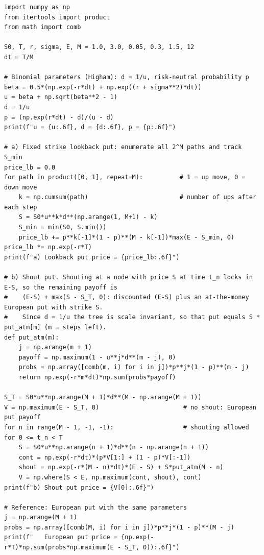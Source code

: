 \documentclass[11pt,a4paper]{article}
\begin{document}
\begin{lstlisting}[caption={Q5: binomial method for the lookback put and the shout put.}, label={lst:q5}]
import numpy as np
from itertools import product
from math import comb

S0, T, r, sigma, E, M = 1.0, 3.0, 0.05, 0.3, 1.5, 12
dt = T/M

# Binomial parameters (Higham): d = 1/u, risk-neutral probability p
beta = 0.5*(np.exp(-r*dt) + np.exp((r + sigma**2)*dt))
u = beta + np.sqrt(beta**2 - 1)
d = 1/u
p = (np.exp(r*dt) - d)/(u - d)
print(f"u = {u:.6f}, d = {d:.6f}, p = {p:.6f}")

# a) Fixed strike lookback put: enumerate all 2^M paths and track S_min
price_lb = 0.0
for path in product([0, 1], repeat=M):          # 1 = up move, 0 = down move
    k = np.cumsum(path)                         # number of ups after each step
    S = S0*u**k*d**(np.arange(1, M+1) - k)
    S_min = min(S0, S.min())
    price_lb += p**k[-1]*(1 - p)**(M - k[-1])*max(E - S_min, 0)
price_lb *= np.exp(-r*T)
print(f"a) Lookback put price = {price_lb:.6f}")

# b) Shout put. Shouting at a node with price S at time t_n locks in E-S, so the remaining payoff is
#    (E-S) + max(S - S_T, 0): discounted (E-S) plus an at-the-money European put with strike S.
#    Since d = 1/u the tree is scale invariant, so that put equals S * put_atm[m] (m = steps left).
def put_atm(m):
    j = np.arange(m + 1)
    payoff = np.maximum(1 - u**j*d**(m - j), 0)
    probs = np.array([comb(m, i) for i in j])*p**j*(1 - p)**(m - j)
    return np.exp(-r*m*dt)*np.sum(probs*payoff)

S_T = S0*u**np.arange(M + 1)*d**(M - np.arange(M + 1))
V = np.maximum(E - S_T, 0)                       # no shout: European put payoff
for n in range(M - 1, -1, -1):                   # shouting allowed for 0 <= t_n < T
    S = S0*u**np.arange(n + 1)*d**(n - np.arange(n + 1))
    cont = np.exp(-r*dt)*(p*V[1:] + (1 - p)*V[:-1])
    shout = np.exp(-r*(M - n)*dt)*(E - S) + S*put_atm(M - n)
    V = np.where(S < E, np.maximum(cont, shout), cont)
print(f"b) Shout put price = {V[0]:.6f}")

# Reference: European put with the same parameters
j = np.arange(M + 1)
probs = np.array([comb(M, i) for i in j])*p**j*(1 - p)**(M - j)
print(f"   European put price = {np.exp(-r*T)*np.sum(probs*np.maximum(E - S_T, 0)):.6f}")
\end{lstlisting}
\end{document}
